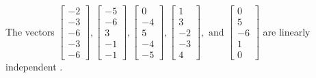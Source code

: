 \begin{exercise}
\begin{exerciseStatement}
  \end{exerciseStatement}
  \begin{exerciseAnswer}
   The vectors \(\left[\begin{array}{r}
-2 \\
-3 \\
-6 \\
-3 \\
-6
\end{array}\right] , \left[\begin{array}{r}
-5 \\
-6 \\
3 \\
-1 \\
-1
\end{array}\right] , \left[\begin{array}{r}
0 \\
-4 \\
5 \\
-4 \\
-5
\end{array}\right] , \left[\begin{array}{r}
1 \\
3 \\
-2 \\
-3 \\
4
\end{array}\right] , \text{ and } \left[\begin{array}{r}
0 \\
5 \\
-6 \\
1 \\
0
\end{array}\right]\) are 
  	 linearly independent  .
  


  \end{exerciseAnswer}
\end{exercise}